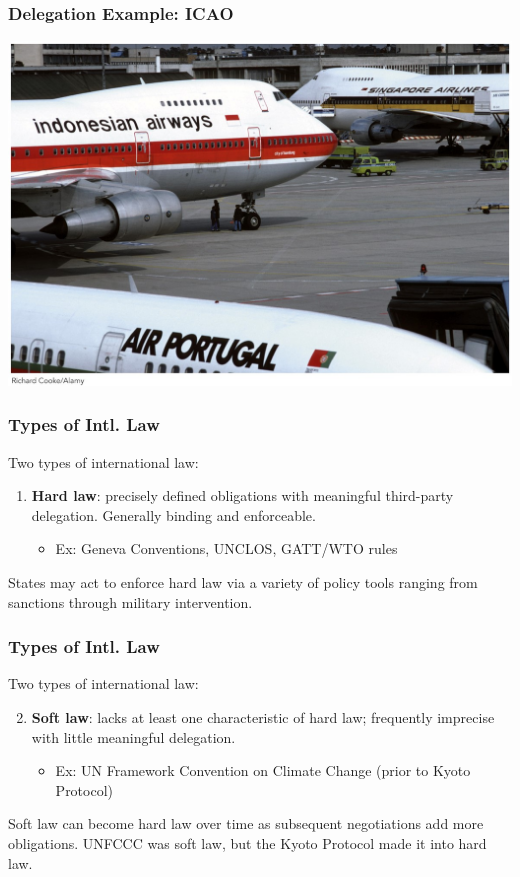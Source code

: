 \documentclass{beamer}
\begin{document}

\begin{frame} 
	\frametitle{\LARGE{Delegation Example: ICAO}}
	\centering
\includegraphics[width=\textwidth,height=\textheight,keepaspectratio]{ICAO.jpg}
\end{frame}

\begin{frame} 
	\frametitle{\LARGE{Types of Intl. Law}}
Two types of international law:
	\begin{enumerate}
		\item \textbf{Hard law}: precisely defined obligations with meaningful third-party delegation. Generally binding and enforceable. \pause
		\begin{itemize}
			\item Ex: Geneva Conventions, UNCLOS, GATT/WTO rules \pause
		\end{itemize}
	\end{enumerate}
States may act to enforce hard law via a variety of policy tools ranging from sanctions through military intervention.
\end{frame}

\begin{frame} 
	\frametitle{\LARGE{Types of Intl. Law}}
	Two types of international law:
	\begin{enumerate}
	  	\setcounter{enumi}{1}
		\item \textbf{Soft law}: lacks at least one characteristic of hard law; frequently imprecise with little meaningful delegation. \pause
		\begin{itemize}
			\item Ex: UN Framework Convention on Climate Change (prior to Kyoto Protocol) 
		\end{itemize}
	\end{enumerate}
	Soft law can become hard law over time as subsequent negotiations add more obligations. UNFCCC was soft law, but the Kyoto Protocol made it into hard law.
\end{frame}
\end{document}
